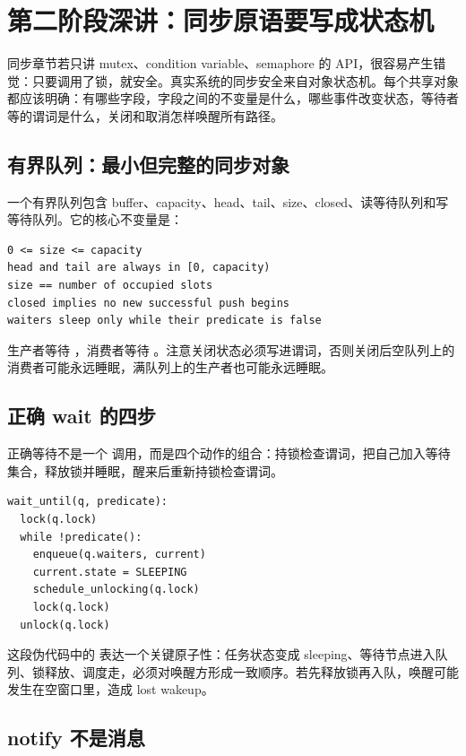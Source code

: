 \section{第二阶段深讲：同步原语要写成状态机}

同步章节若只讲 mutex、condition variable、semaphore 的 API，很容易产生错觉：只要调用了锁，就安全。真实系统的同步安全来自对象状态机。每个共享对象都应该明确：有哪些字段，字段之间的不变量是什么，哪些事件改变状态，等待者等的谓词是什么，关闭和取消怎样唤醒所有路径。

\subsection{有界队列：最小但完整的同步对象}

一个有界队列包含 buffer、capacity、head、tail、size、closed、读等待队列和写等待队列。它的核心不变量是：

\begin{lstlisting}
0 <= size <= capacity
head and tail are always in [0, capacity)
size == number of occupied slots
closed implies no new successful push begins
waiters sleep only while their predicate is false
\end{lstlisting}

生产者等待 ，消费者等待 。注意关闭状态必须写进谓词，否则关闭后空队列上的消费者可能永远睡眠，满队列上的生产者也可能永远睡眠。

\subsection{正确 wait 的四步}

正确等待不是一个  调用，而是四个动作的组合：持锁检查谓词，把自己加入等待集合，释放锁并睡眠，醒来后重新持锁检查谓词。

\begin{lstlisting}
wait_until(q, predicate):
  lock(q.lock)
  while !predicate():
    enqueue(q.waiters, current)
    current.state = SLEEPING
    schedule_unlocking(q.lock)
    lock(q.lock)
  unlock(q.lock)
\end{lstlisting}

这段伪代码中的  表达一个关键原子性：任务状态变成 sleeping、等待节点进入队列、锁释放、调度走，必须对唤醒方形成一致顺序。若先释放锁再入队，唤醒可能发生在空窗口里，造成 lost wakeup。

\subsection{notify 不是消息}

